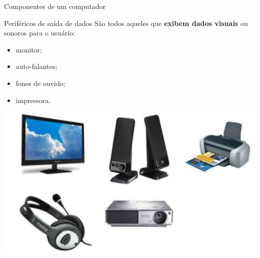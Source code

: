 \begin{frame}{Componentes de um computador}
	\begin{block}{Periféricos de saída de dados}
		São todos aqueles que \textbf{exibem dados visuais} ou sonoros
		para o usuário:
		\begin{itemize}
			\item monitor;
			\item auto-falantes;
			\item fones de ouvido;
			\item impressora.
		\end{itemize}
	\end{block}

	\centering
	\includegraphics[width=0.6\linewidth]{Figuras/Ch01/fig26}
\end{frame}


